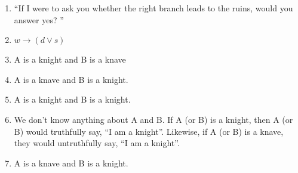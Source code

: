 \documentclass{sig-alternate-05-2015}
\begin{document}
\begin{enumerate}
\item \textquotedblleft If I were to ask you whether the right branch
leads to the ruins, would you answer yes? \textquotedblright
\item $w \rightarrow (d \vee s)$
\item A is a knight and B is a knave
\item A is a knave and B is a knight.
\item A is a knight and B is a knight.
\item We don\textquoteright t know anything about A and B. If A (or B) is a knight, then A (or B) would
truthfully say, \textquotedblleft I am a knight\textquotedblright. Likewise, if A (or B) is a knave, they would untruthfully
say, \textquotedblleft I am a knight\textquotedblright.
\item A is a knave and B is a knight.
\end{enumerate}
\end{document}
